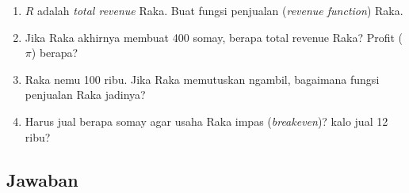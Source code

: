 \documentclass[
  letterpaper,
  DIV=11,
  numbers=noendperiod]{scrartcl}
\providecommand{\tightlist}{%
  \setlength{\itemsep}{0pt}\setlength{\parskip}{0pt}}\usepackage{longtable,booktabs,array}
\begin{document}
\begin{enumerate}
\def\labelenumi{\alph{enumi}.}
\tightlist
\item
  \(R\) adalah \emph{total revenue} Raka. Buat fungsi penjualan
  (\emph{revenue function}) Raka.
\item
  Jika Raka akhirnya membuat 400 somay, berapa total revenue Raka?
  Profit (\(\pi\)) berapa?
\item
  Raka nemu 100 ribu. Jika Raka memutuskan ngambil, bagaimana fungsi
  penjualan Raka jadinya?
\item
  Harus jual berapa somay agar usaha Raka impas (\emph{breakeven})? kalo
  jual 12 ribu?
\end{enumerate}

\subsection{Jawaban}\label{jawaban}
\end{document}
